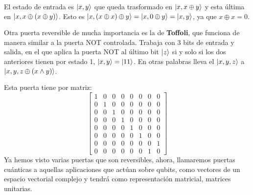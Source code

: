 \documentclass[a4paper]{article}
\numberwithin{equation}{section}
\begin{document}
\begin{figure}[h]
\centering
{}
\end{figure}

El estado de entrada es $\ket{x, y}$ que queda trasformado en $\ket{x, x\oplus y}$ y esta última en $\ket{x, x\oplus (x\oplus y)}$. Esto es $\ket{x, (x\oplus x) \oplus y} = \ket{x, 0\oplus y} = \ket{x, y}$, ya que $x\oplus x = 0$.

Otra puerta reversible de mucha importancia es la de \textbf{Toffoli},
que funciona de manera similar a la puerta NOT controlada. Trabaja con 3 bits de entrada y salida, en el que aplica la puerta NOT al último bit $\ket{z}$ si y solo si los dos anteriores tienen por estado 1, $\ket{x, y} = \ket{11}$. En otras palabras lleva el $\ket{x,y,z}$ a $\ket{x,y,z\oplus(x\wedge y)}$. \\
\begin{figure}[h]
\centering
{}
\end{figure}

Esta puerta tiene por matriz:
\begin{equation}
\begin{bmatrix}
1 & 0 & 0 & 0 & 0 & 0 & 0 & 0 \\
0 & 1 & 0 & 0 & 0 & 0 & 0 & 0 \\
0 & 0 & 1 & 0 & 0 & 0 & 0 & 0 \\
0 & 0 & 0 & 1 & 0 & 0 & 0 & 0 \\
0 & 0 & 0 & 0 & 1 & 0 & 0 & 0 \\
0 & 0 & 0 & 0 & 0 & 1 & 0 & 0 \\
0 & 0 & 0 & 0 & 0 & 0 & 0 & 1 \\
0 & 0 & 0 & 0 & 0 & 0 & 1 & 0
\end{bmatrix}
\end{equation}
Ya hemos visto varias puertas que son reversibles, ahora, llamaremos puertas cuánticas a aquellas aplicaciones que actúan sobre qubits, como vectores de un espacio vectorial complejo y tendrá como representación matricial, matrices unitarias.
\end{document}

